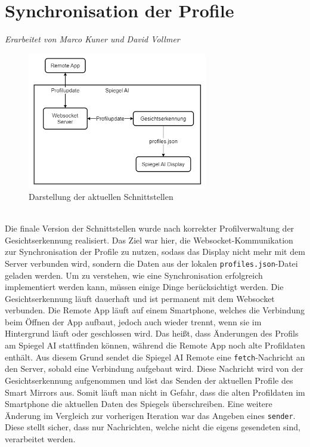 \section{Synchronisation der Profile}
\textit{Erarbeitet von Marco Kuner und David Vollmer} \\
\begin{figure}[h]
    \centering
    \includegraphics[width=0.7\textwidth]{pictures/websocket_diagram.png}
    \captionsetup{justification=centering, labelformat=simple, singlelinecheck=false}
    \caption{Darstellung der aktuellen Schnittstellen}
    \label{fig:websocket_diagram}
\end{figure} \\
Die finale Version der Schnittstellen wurde nach korrekter Profilverwaltung der Gesichtserkennung realisiert. Das Ziel war hier, die Websocket-Kommunikation zur Synchronisation der Profile zu nutzen, sodass das Display nicht mehr mit dem Server verbunden wird, sondern die Daten aus der lokalen \texttt{profiles.json}-Datei geladen werden. Um zu verstehen, wie eine Synchronisation erfolgreich implementiert werden kann, müssen einige Dinge berücksichtigt werden. Die Gesichtserkennung läuft dauerhaft und ist permanent mit dem Websocket verbunden. Die Remote App läuft auf einem Smartphone, welches die Verbindung beim Öffnen der App aufbaut, jedoch auch wieder trennt, wenn sie im Hintergrund läuft oder geschlossen wird. Das heißt, dass Änderungen des Profils am Spiegel AI stattfinden können, während die Remote App noch alte Profildaten enthält. Aus diesem Grund sendet die Spiegel AI Remote eine \texttt{fetch}-Nachricht an den Server, sobald eine Verbindung aufgebaut wird. Diese Nachricht wird von der Gesichtserkennung aufgenommen und löst das Senden der aktuellen Profile des Smart Mirrors aus. Somit läuft man nicht in Gefahr, dass die alten Profildaten im Smartphone die aktuellen Daten des Spiegels überschreiben. Eine weitere Änderung im Vergleich zur vorherigen Iteration war das Angeben eines \texttt{sender}. Diese stellt sicher, dass nur Nachrichten, welche nicht die eigens gesendeten sind, verarbeitet werden.

